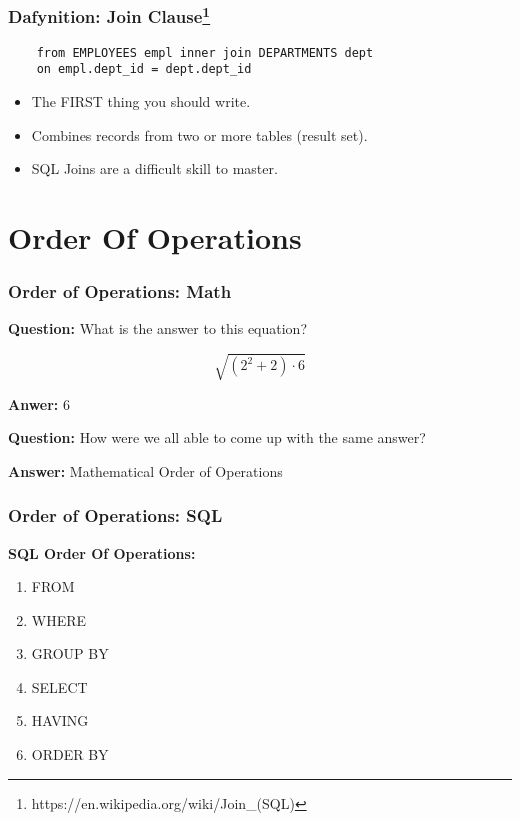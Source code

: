 \documentclass{beamer}
\begin{document}
\begin{frame}[fragile] %
  \frametitle{Dafynition: Join Clause\footnote{https://en.wikipedia.org/wiki/Join\_(SQL)}}

  \begin{lstlisting}
    from EMPLOYEES empl inner join DEPARTMENTS dept
    on empl.dept_id = dept.dept_id
  \end{lstlisting}

  \begin{itemize}
  \item The FIRST thing you should write.
  \item Combines records from two or more tables (result set).
  \item SQL Joins are a difficult skill to master.
  \end{itemize}

\end{frame}  



\section{Order Of Operations} %

\begin{frame} %
  \frametitle{Order of Operations: Math}

  \textbf{Question: }What is the answer to this equation?

  \bigskip
  \[\sqrt{(2^2+2) \cdot 6}\]

  \pause
  \bigskip
  \textbf{Anwer:} 6

  \bigskip
  \pause
  \textbf{Question: }How were we all able to come up with the same
  answer?

  \pause
  \bigskip
  \textbf{Answer:} Mathematical Order of Operations

\end{frame}

\begin{frame} %
  \frametitle{Order of Operations: SQL}

  \textbf{SQL Order Of Operations: }

  \medskip
  \begin{enumerate}
  \item FROM
  \item WHERE
  \item GROUP BY
  \item SELECT
  \item HAVING
  \item ORDER BY
  \end{enumerate}

\end{frame}
\end{document}
